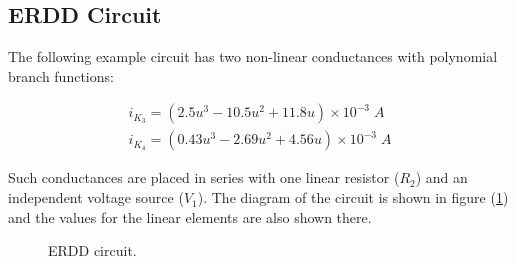 \documentclass[conference,letterpaper,onecolumn,11pt]{IEEEtran}
\begin{document}
\begin{table}[!h]
\center{
\footnotesize{
\begin{tabular}{||c|c|c|c||}
\hline\hline
($n+m$)-th & ($n+m-1$) & \# of & Total \\
in Chao's  & in Optimizing & Roots  & Time \\
 Equation     & Equations &     &   \\
\hline\hline
${V_1}$ & \ding{172},\ding{173} & 1 & 3.000 \\ \hline
${V_1}$ & \ding{172},${V_1}$ & 1 & 3.550  \\ \hline
${V_1}$ & \ding{173},${V_1}$ & 1 & 3.569  \\ \hline
\ding{173} & \ding{172},\ding{173} & 1 & 3.120  \\ \hline
\ding{173} & \ding{172},${V_1}$ & 1 & 3.089  \\ \hline
\ding{173} & \ding{173},${V_1}$ & 1 & 3.130  \\ \hline
\ding{172} & \ding{172},\ding{173} & 3 & 4.369  \\ \hline
\ding{172} & \ding{172},${V_1}$ & 3 & 4.139  \\ \hline
\ding{172}  & \ding{173},${V_1}$ & 3 & 3.999 \\ \hline \hline
\end{tabular}
}}
\caption{Chao's method simulations for ERD circuit.}
\label{ERDchao}
\end{table}

\subsection{ERDD Circuit}

The following example circuit has two non-linear conductances with polynomial branch functions:

\begin{displaymath}
\begin{array}{r}
i_{K_3}=(2.5u^3-10.5u^2+11.8u)\times 10^{-3} \;A \\
i_{K_4}=(0.43u^3-2.69u^2+4.56u)\times 10^{-3} \;A
\end{array}
\end{displaymath}

Such conductances are placed in series with one linear resistor ($R_2$) and an independent voltage source ($V_1$). The diagram of the circuit is shown in figure (\ref{cirERDD}) and the values for the linear elements are also shown there. 

\begin{figure}[!h]
\centerline{
\epsfxsize=70mm
}
\caption{ERDD circuit.}
\label{cirERDD}
\end{figure}
\end{document}

